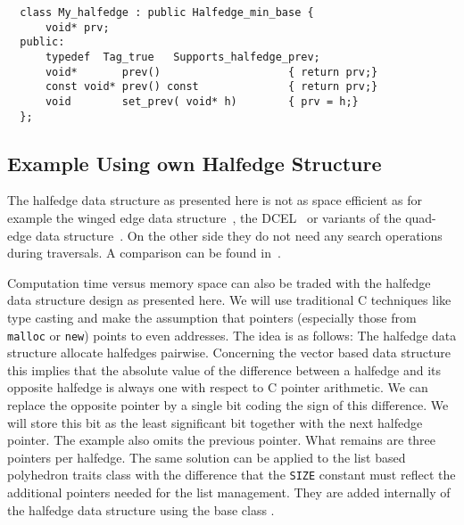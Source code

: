 \begin{verbatim}
  class My_halfedge : public Halfedge_min_base {
      void* prv;
  public:
      typedef  Tag_true   Supports_halfedge_prev;
      void*       prev()                    { return prv;}
      const void* prev() const              { return prv;}
      void        set_prev( void* h)        { prv = h;}
  };  
\end{verbatim}

\subsection{Example Using own Halfedge Structure}

\begin{ccAdvanced}
  
The halfedge data structure as presented here is not as space efficient as
for example the winged
edge data structure~\cite{b-prcv-75}, the DCEL~\cite{mp-fitcp-78} or
variants of the quad-edge data structure~\cite{gs-pmgsc-85}.
On the other side they do not need any search operations during
traversals. A comparison can be found in~\cite{k-ddsps-98}.

Computation time versus memory space can also be traded with the
halfedge data structure design as presented here.  We will use
traditional C techniques like type casting and make the assumption
that pointers (especially those from {\tt malloc} or {\tt new}) points
to even addresses. The idea is as follows: The halfedge data structure
allocate halfedges pairwise.  Concerning the vector based data
structure this implies that the absolute value of the difference
between a halfedge and its opposite halfedge is always one with
respect to C pointer arithmetic. We can replace the opposite pointer
by a single bit coding the sign of this difference.  We will store
this bit as the least significant bit together with the next halfedge
pointer.  The example also omits the previous pointer. What remains
are three pointers per halfedge. The same solution can be applied to
the list based polyhedron traits class with the difference that the
{\tt SIZE} constant must reflect the additional pointers needed for
the list management. They are added internally of the halfedge data
structure using the base class .



\end{ccAdvanced}

